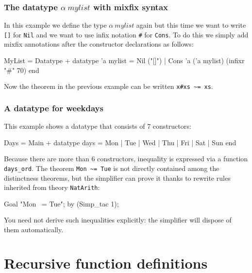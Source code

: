 \subsubsection{The datatype $\alpha~mylist$ with mixfix syntax}

In this example we define the type $\alpha~mylist$ again but this time
we want to write \texttt{[]} for \texttt{Nil} and we want to use infix
notation \verb|#| for \texttt{Cons}.  To do this we simply add mixfix
annotations after the constructor declarations as follows:
\begin{ttbox}
MyList = Datatype +
  datatype 'a mylist =
    Nil ("[]")  |
    Cons 'a ('a mylist)  (infixr "#" 70)
end
\end{ttbox}
Now the theorem in the previous example can be written \verb|x#xs ~= xs|.


\subsubsection{A datatype for weekdays}

This example shows a datatype that consists of 7 constructors:
\begin{ttbox}
Days = Main +
  datatype days = Mon | Tue | Wed | Thu | Fri | Sat | Sun
end
\end{ttbox}
Because there are more than 6 constructors, inequality is expressed via a function
\verb|days_ord|.  The theorem \verb|Mon ~= Tue| is not directly
contained among the distinctness theorems, but the simplifier can
prove it thanks to rewrite rules inherited from theory \texttt{NatArith}:
\begin{ttbox}
Goal "Mon ~= Tue";
by (Simp_tac 1);
\end{ttbox}
You need not derive such inequalities explicitly: the simplifier will dispose
of them automatically.


\section{Recursive function definitions}\label{sec:HOL:recursive}

